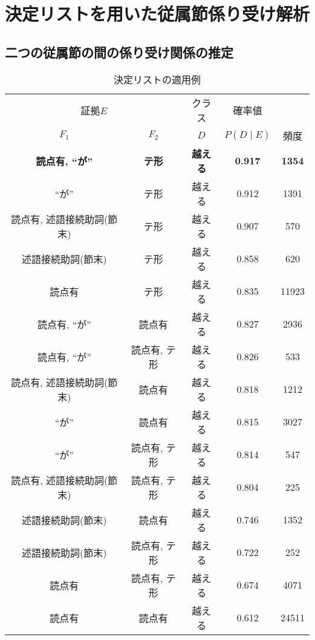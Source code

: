 \section{決定リストを用いた従属節係り受け解析}
\label{sec:ana}

\subsection{二つの従属節の間の係り受け関係の推定}


\begin{table}
  \begin{center}
	\caption{決定リストの適用例}
	\label{tab:dlap}
    \begin{tabular}[c]{|c|c|c|c|c|}  \hline
	\multicolumn{2}{|c|}{証拠$E$} &	 クラス & 確率値 & \\ \cline{1-2}
	$F_1$ & $F_2$ & $D$ & $P(D\mid E)$ & 頻度 \\ \hline\hline
	{\bf 読点有, ``が''} & {\bf テ形} & {\bf 越える} & {\bf 0.917} & {\bf 1354} \\
	``が'' & テ形 & 越える & 0.912 & 1391 \\
	読点有,	述語接続助詞(節末) & テ形 & 越える & 0.907 & 570 \\
	述語接続助詞(節末) & テ形 & 越える & 0.858 & 620 \\
	読点有 & テ形  & 越える & 0.835 & 11923 \\
	読点有, ``が'' & 読点有 & 越える & 0.827 & 2936 \\
	読点有, ``が'' & 読点有, テ形 & 越える & 0.826 & 533 \\ 
	読点有, 述語接続助詞(節末) & 読点有 & 越える & 0.818 & 1212 \\
	``が'' & 読点有 & 越える & 0.815 & 3027 \\
	``が'' & 読点有, テ形 & 越える & 0.814 & 547 \\
	読点有, 述語接続助詞(節末) & 読点有, テ形 & 越える & 0.804 & 225 \\
	述語接続助詞(節末) & 読点有 & 越える & 0.746 & 1352 \\
	述語接続助詞(節末) & 読点有, テ形 & 越える & 0.722 & 252 \\
	読点有 & 読点有, テ形 & 越える & 0.674 & 4071 \\
	読点有 & 読点有 & 越える & 0.612 & 24511 \\ \hline
    \end{tabular}
  \end{center}
\end{table}

